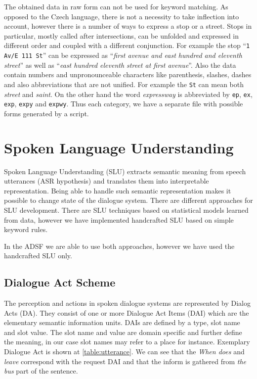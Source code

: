 The obtained data in raw form can not be used for keyword matching. As opposed to the Czech language, there is not a necessity to take inflection into account, however there is a number of ways to express a stop or a street.
Stops in particular, mostly called after intersections, can be unfolded and expressed in different order and coupled with a different conjunction.
For example the stop ``\texttt{1 Av/E 111 St}'' can be expressed as ``\textit{first avenue and east hundred and eleventh street}'' as well as ``\textit{east hundred eleventh street at first avenue}''.
Also the data contain numbers and unpronounceable characters like parenthesis, slashes, dashes and also abbreviations that are not unified.
For example the \texttt{St} can mean both \textit{street} and \textit{saint}.
On the other hand the word \textit{expressway} is abbreviated by \texttt{ep}, \texttt{ex}, \texttt{exp}, \texttt{expy} and \texttt{expwy}.
Thus each category, we have a separate file with possible forms generated by a script.

\section{Spoken Language Understanding}

Spoken Language Understanding (SLU) extracts semantic meaning from speech utterances (ASR hypothesis) and translates them into interpretable representation.
Being able to handle such semantic representation makes it possible to change state of the dialogue system.
There are different approaches for SLU development.
There are SLU techniques based on statistical models learned from data, however we have implemented handcrafted SLU based on simple keyword rules.  %





In the ADSF we are able to use both approaches, however we have used the handcrafted SLU only.





\subsection{Dialogue Act Scheme}

The perception and actions in spoken dialogue systems are represented by Dialog Acts (DA).
They consist of one or more Dialogue Act Items (DAI) which are the elementary semantic information units.
DAIs are defined by a type, slot name and slot value.
The slot name and value are domain specific and further define the meaning, in our case slot names may refer to a place for instance.
Exemplary Dialogue Act is shown at \ref{table:utterance}. We can see that the \textit{When does} and \textit{leave} correspond with the request DAI and that the inform is gathered from \textit{the bus} part of the sentence.

